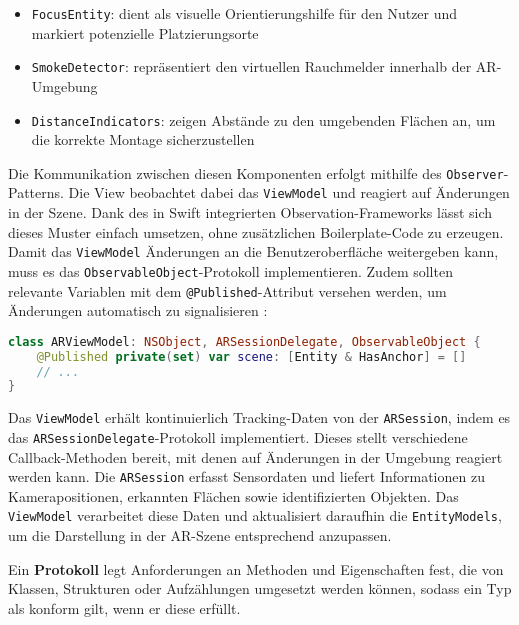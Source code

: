 \begin{itemize}
    \item \texttt{FocusEntity}: dient als visuelle Orientierungshilfe für den Nutzer und markiert potenzielle Platzierungsorte
    \item \texttt{SmokeDetector}: repräsentiert den virtuellen Rauchmelder innerhalb der AR-Umgebung
    \item \texttt{DistanceIndicators}: zeigen Abstände zu den umgebenden Flächen an, um die korrekte Montage sicherzustellen
\end{itemize}

Die Kommunikation zwischen diesen Komponenten erfolgt mithilfe des \texttt{Observer}-Patterns. Die View beobachtet dabei das \texttt{ViewModel} und reagiert auf Änderungen in der Szene. Dank des in Swift integrierten Observation-Frameworks lässt sich dieses Muster einfach umsetzen, ohne zusätzlichen Boilerplate-Code zu erzeugen. Damit das \texttt{ViewModel} Änderungen an die Benutzeroberfläche weitergeben kann, muss es das \texttt{ObservableObject}-Protokoll implementieren. Zudem sollten relevante Variablen mit dem \texttt{@Published}-Attribut versehen werden, um Änderungen automatisch zu signalisieren \cite{appledevdoc}:

\begin{lstlisting}[language=Swift]
class ARViewModel: NSObject, ARSessionDelegate, ObservableObject {
    @Published private(set) var scene: [Entity & HasAnchor] = []
    // ...
}
\end{lstlisting}

Das \texttt{ViewModel} erhält kontinuierlich Tracking-Daten von der \texttt{ARSession}, indem es das \linebreak\texttt{ARSessionDelegate}-Protokoll implementiert. Dieses stellt verschiedene Callback-Methoden bereit, mit denen auf Änderungen in der Umgebung reagiert werden kann. Die \texttt{ARSession} erfasst Sensordaten und liefert Informationen zu Kamerapositionen, erkannten Flächen sowie identifizierten Objekten. Das \texttt{ViewModel} verarbeitet diese Daten und aktualisiert daraufhin die \texttt{EntityModels}, um die Darstellung in der AR-Szene entsprechend anzupassen. \cite{appledevdoc}

\begin{tcolorbox}[colback=THAi-Blue!20!white, colframe=THAi-Blue]
    Ein \textbf{Protokoll} legt Anforderungen an Methoden und Eigenschaften fest, die von Klassen, Strukturen oder Aufzählungen umgesetzt werden können, sodass ein Typ als konform gilt, wenn er diese erfüllt. \cite{apple2025swift}
\end{tcolorbox}  

